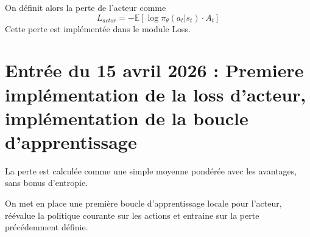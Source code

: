 \documentclass[11pt,a4paper]{article}
\begin{document}
On définit alors la perte de l'acteur comme 
\[
L_{actor} = -\mathbb{E}[\log\pi_\theta (a_t|s_t)\cdot A_t]
\]
Cette perte est implémentée dans le module Loss. 

\section*{Entrée du 15 avril 2026 : Premiere implémentation de la loss d'acteur, implémentation de la boucle d'apprentissage}
La perte est calculée comme une simple moyenne pondérée avec les avantages, sans bonus d'entropie. 

On met en place une première boucle d'apprentissage locale pour l'acteur, réévalue la politique courante sur les actions et entraine sur la perte précédemment définie. 
\end{document}
